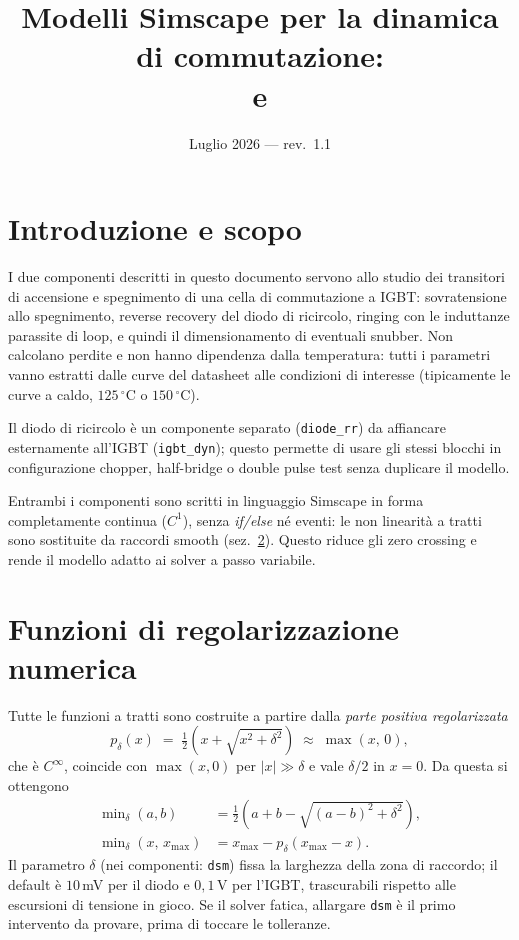 \documentclass[11pt,a4paper]{article}
\title{Modelli Simscape per la dinamica di commutazione:\\
\ssc{diode\_rr} e \ssc{igbt\_dyn}}
\author{}
\date{Luglio 2026 --- rev.\ 1.1}
\newcommand{\ssc}[1]{\texttt{#1}}
\begin{document}
\maketitle

\section{Introduzione e scopo}

I due componenti descritti in questo documento servono allo studio dei
transitori di accensione e spegnimento di una cella di commutazione a
IGBT: sovratensione allo spegnimento, reverse recovery del diodo di
ricircolo, ringing con le induttanze parassite di loop, e quindi il
dimensionamento di eventuali snubber. Non calcolano perdite e non hanno
dipendenza dalla temperatura: tutti i parametri vanno estratti dalle
curve del datasheet alle condizioni di interesse (tipicamente le curve a
caldo, $125\,^{\circ}\mathrm{C}$ o $150\,^{\circ}\mathrm{C}$).

Il diodo di ricircolo \`e un componente separato (\ssc{diode\_rr}) da
affiancare esternamente all'IGBT (\ssc{igbt\_dyn}); questo permette di
usare gli stessi blocchi in configurazione chopper, half-bridge o double
pulse test senza duplicare il modello.

Entrambi i componenti sono scritti in linguaggio Simscape in forma
completamente continua ($C^1$), senza \emph{if/else} n\'e eventi: le non
linearit\`a a tratti sono sostituite da raccordi smooth
(sez.~\ref{sec:smooth}). Questo riduce gli zero crossing e rende il
modello adatto ai solver a passo variabile.

\section{Funzioni di regolarizzazione numerica}
\label{sec:smooth}

Tutte le funzioni a tratti sono costruite a partire dalla \emph{parte
positiva regolarizzata}
\begin{equation}
p_\delta(x) \;=\; \tfrac{1}{2}\left(x + \sqrt{x^2 + \delta^2}\right)
\;\approx\; \max(x,\,0),
\label{eq:softplus}
\end{equation}
che \`e $C^\infty$, coincide con $\max(x,0)$ per $|x|\gg\delta$ e vale
$\delta/2$ in $x=0$. Da questa si ottengono
\begin{align}
\min\nolimits_\delta(a,b) &= \tfrac{1}{2}\left(a+b-\sqrt{(a-b)^2+\delta^2}\right),\\
\min\nolimits_\delta(x,\,x_{\max}) &= x_{\max} - p_\delta(x_{\max}-x).
\label{eq:smoothmin}
\end{align}
Il parametro $\delta$ (nei componenti: \ssc{dsm}) fissa la larghezza
della zona di raccordo; il default \`e $10\,$mV per il diodo e
$0{,}1\,$V per l'IGBT, trascurabili rispetto alle escursioni di tensione
in gioco. Se il solver fatica, allargare \ssc{dsm} \`e il primo
intervento da provare, prima di toccare le tolleranze.
\end{document}
